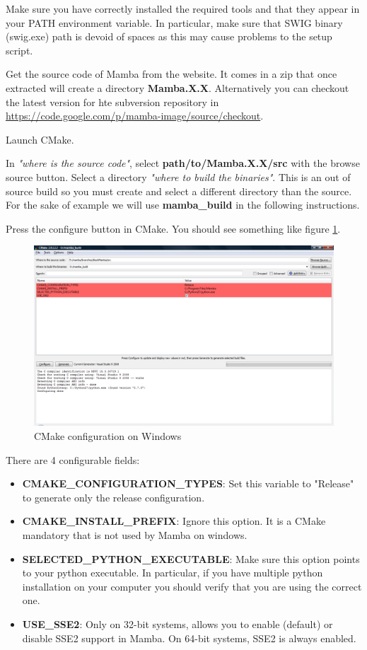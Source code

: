 \documentclass[a4paper,10pt,oneside]{article}
\begin{document}
Make sure you have correctly installed the required tools and that they appear
in your PATH environment variable. In particular, make sure that SWIG binary
(swig.exe) path is devoid of spaces as this may cause problems to the setup
script.

Get the source code of Mamba from the website. It comes in a zip that once
extracted will create a directory \textbf{Mamba.X.X}. Alternatively you can
checkout the latest version for hte subversion repository in 
\url{https://code.google.com/p/mamba-image/source/checkout}.

Launch CMake.

In \textit{"where is the source code"}, select \textbf{path/to/Mamba.X.X/src} with
the browse source button. Select a directory \textit{"where to build the binaries"}.
This is an out of source build so you must create and select a different
directory than the source. For the sake of example we will use
\textbf{mamba\_build} in the following instructions.

Press the configure button in CMake. You should see something like
figure \ref{fig:cmake_win}.

\begin{figure}
\centering
\includegraphics[scale=0.3]{images/cmake_win.png}
\caption{CMake configuration on Windows}
\label{fig:cmake_win}
\end{figure}

There are 4 configurable fields:
\begin{itemize}
\item \textbf{CMAKE\_CONFIGURATION\_TYPES}: Set this variable to "Release" to 
generate only the release configuration.
\item \textbf{CMAKE\_INSTALL\_PREFIX}: Ignore this option. It is a CMake 
mandatory that is not used by Mamba on windows.
\item \textbf{SELECTED\_PYTHON\_EXECUTABLE}: Make sure this option points 
to your python executable. In particular, if you have multiple python 
installation on your computer you should verify that you are using the 
correct one.
\item \textbf{USE\_SSE2}: Only on 32-bit systems, allows you to enable (default)
or disable SSE2 support in Mamba. On 64-bit systems, SSE2 is always enabled.
\end{itemize}
\end{document}
